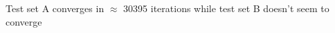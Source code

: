 \begin{answer}
    Test set A converges in $\approx$ 30395 iterations while test set B doesn't seem to converge
\end{answer}
